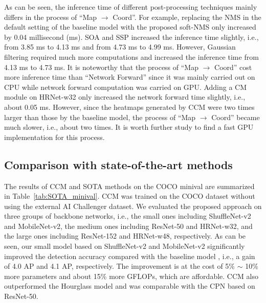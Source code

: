 \documentclass[twocolumn]{svjour3}          \smartqed  \usepackage{natbib}
\begin{document}
As can be seen, the inference time of different post-processing techniques mainly differs in the process of ``Map $\rightarrow$ Coord''. For example, replacing the NMS in the default setting of the baseline model \citep{xiao2018simple} with the proposed soft-NMS only increased by 0.04 millisecond (ms). SOA and SSP increased the inference time slightly, i.e., from 3.85 ms to 4.13 ms and from 4.73 ms to 4.99 ms. However, Gaussian filtering required much more computations and increased the inference time from 4.13 ms to 4.73 ms. It is noteworthy that the process of ``Map $\rightarrow$ Coord'' cost more inference time than ``Network Forward'' since it was mainly carried out on CPU while network forward computation was carried on GPU. Adding a CM module on HRNet-w32 only increased the network forward time slightly, i.e., about 0.05 ms. However, since the heatmaps generated by CCM were two times larger than those by the baseline model, the process of ``Map $\rightarrow$ Coord'' became much slower, i.e., about two times. It is worth further study to find a fast GPU implementation for this process.

\subsection{Comparison with state-of-the-art methods}
\label{subsec:mainResults}
The results of CCM and SOTA methods on the COCO minival are summarized in Table~\ref{tab:SOTA_minival}. CCM was trained on the COCO dataset without using the external AI Challenger dataset. We evaluated the proposed approach on three groups of backbone networks, i.e., the small ones including ShuffleNet-v2 and MobileNet-v2, the medium ones including ResNet-50 and HRNet-w32, and the large ones including ResNet-152 and HRNet-w48, respectively. As can be seen, our small model based on ShuffleNet-v2 and MobileNet-v2 significantly improved the detection accuracy compared with the baseline model \citep{xiao2018simple}, i.e., a gain of 4.0 AP and 4.1 AP, respectively. The improvement is at the cost of 5\% $\sim$ 10\% more parameters and about 15\% more GFLOPs, which are affordable. CCM also outperformed the Hourglass model \citep{newell2016stacked} and was comparable with the CPN \citep{chen2018cascaded} based on ResNet-50. 
\end{document}

